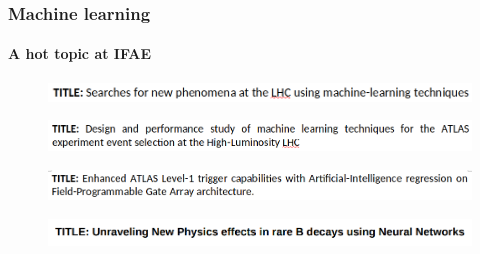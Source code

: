 \documentclass[aspectratio=43]{beamer}
\begin{document}
\begin{frame}

	\frametitle{Machine learning}
	\framesubtitle{A hot topic at IFAE}
	
	\begin{figure}[!htb]
		\includegraphics[width = \linewidth]{mlatlas1.png}
	\end{figure}

	\begin{figure}[!htb]
		\includegraphics[width = \linewidth]{mlatlas2.png}
	\end{figure}

	\begin{figure}[!htb]
		\includegraphics[width = \linewidth]{mlatlas3.png}
	\end{figure}

	\begin{figure}[!htb]
		\includegraphics[width = \linewidth]{mltheory.png}
	\end{figure}

\end{frame}
\end{document}
